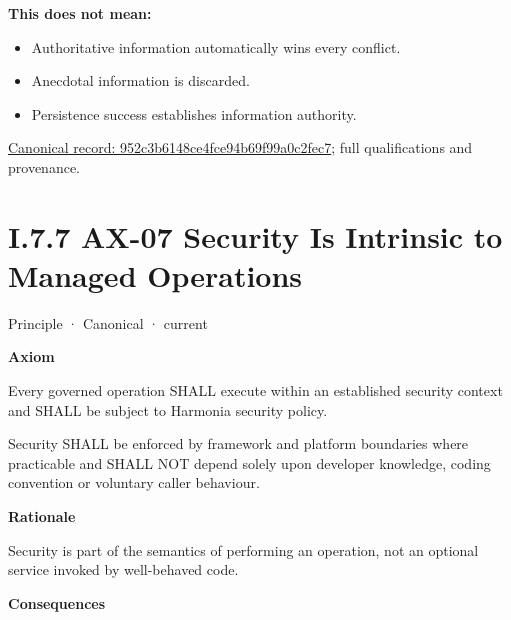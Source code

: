 \textbf{This does not mean:}



\begin{itemize}


\item Authoritative information automatically wins every conflict.

\item Anecdotal information is discarded.

\item Persistence success establishes information authority.

\end{itemize}

{\footnotesize \href{../../../../continuum/motivation/principle/952c3b6148ce4fce94b69f99a0c2fec7.md}{Canonical record: 952c3b6148ce4fce94b69f99a0c2fec7}; full qualifications and provenance.}\par
\section*{I.7.7 AX-07 Security Is Intrinsic to Managed Operations}
\label{navigation:I.7.7}

\label{element:5de2ae2c3b794c2d9f3a14efd51d564f}
{\small Principle · Canonical · current}\par

\par\medskip\textbf{Axiom}\par


Every governed operation SHALL execute within an established security
context and SHALL be subject to Harmonia security policy.



Security SHALL be enforced by framework and platform boundaries where
practicable and SHALL NOT depend solely upon developer knowledge, coding
convention or voluntary caller behaviour.



\par\medskip\textbf{Rationale}\par


Security is part of the semantics of performing an operation, not an
optional service invoked by well-behaved code.



\par\medskip\textbf{Consequences}\par


